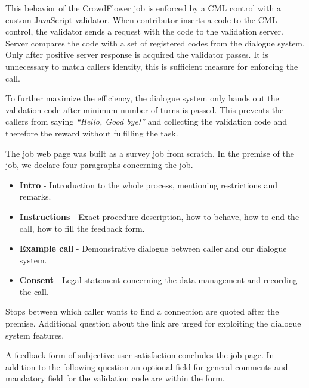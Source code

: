 This behavior of the CrowdFlower job is enforced by a CML control with a custom JavaScript validator.
When contributor inserts a code to the CML control, the validator sends a request with the code to the validation server.
Server compares the code with a set of registered codes from the dialogue system.
Only after positive server response is acquired the validator passes.
It is unnecessary to match callers identity, this is sufficient measure for enforcing the call.

To further maximize the efficiency, the dialogue system only hands out the validation code after minimum number of turns is passed. %
This prevents the callers from saying \textit{``Hello, Good bye!''} and collecting the validation code and therefore the reward without fulfilling the task.

The job web page was built as a survey job from scratch.
In the premise of the job, we declare four paragraphs concerning the job.

\begin{itemize}
	\item \textbf{Intro} - Introduction to the whole process, mentioning restrictions and remarks. %
	\item \textbf{Instructions} - Exact procedure description,  how to behave, how to end the call, how to fill the feedback form.
	\item \textbf{Example call} - Demonstrative dialogue between caller and our dialogue system.
	\item \textbf{Consent} - Legal statement concerning the data management and recording the call.
\end{itemize}

Stops between which caller wants to find a connection are quoted after the premise.
Additional question about the link are urged for exploiting the dialogue system features.

A feedback form of subjective user satisfaction concludes the job page.
In addition to the following question an optional field for general comments and mandatory field for the validation code are within the form.

